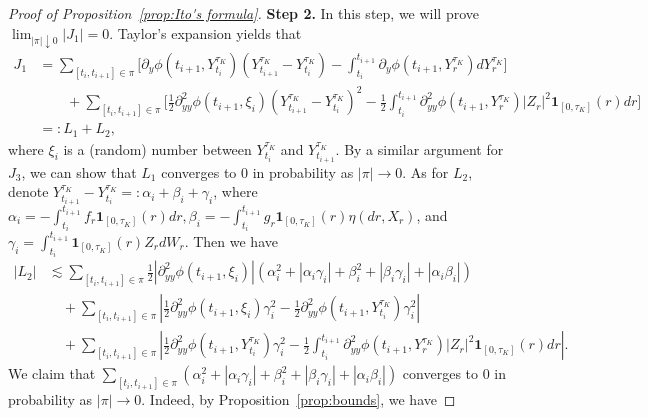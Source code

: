 \documentclass[11pt,reqno]{amsart}
\numberwithin{equation}{section}
\begin{document}
\begin{proof}[Proof of Proposition~\ref{prop:Ito's formula}]
\textbf{ Step 2.} In this step, we will prove $\lim_{|\pi|\downarrow 0} |J_1|=0$. Taylor's expansion yields that
\begin{equation*}					
\begin{aligned}
J_{1} &= \sum_{[t_{i},t_{i+1}]\in\pi}\Big[ \partial_{y}\phi(t_{i+1},Y^{\tau_{K}}_{t_{i}})\left(Y^{\tau_{K}}_{t_{i+1}}-Y^{\tau_{K}}_{t_{i}}\right) - \int_{t_{i}}^{t_{i+1}}\partial_{y}\phi(t_{i+1},Y^{\tau_{K}}_{r})dY^{\tau_{K}}_{r}\Big]\\
&\qquad + \sum_{[t_{i},t_{i+1}]\in\pi}\Big[ \frac{1}{2} \partial^{2}_{yy}\phi(t_{i+1},\xi_{i})\left(Y^{\tau_{K}}_{t_{i+1}}-Y^{\tau_{K}}_{t_i}\right)^{2}  - \frac{1}{2}\int_{t_{i}}^{t_{i+1}}\partial^{2}_{yy}\phi(t_{i+1},Y^{\tau_{K}}_{r})|Z_{r}|^{2}\mathbf{1}_{[0,\tau_{K}]}(r)dr\Big]\\[1mm]
&=: L_{1} + L_{2},
\end{aligned}
\end{equation*}
where $\xi_{i}$ is a (random) number between $Y_{t_{i}}^{\tau_K}$ and $Y_{t_{i+1}}^{\tau_K}$. 
By a similar argument for $J_3$, we can show that $L_1$ converges to 0 in probability as $|\pi|\to0$. As for $L_{2}$, denote $Y^{\tau_{K}}_{t_{i+1}}-Y^{\tau_{K}}_{t_{i}} =: \alpha_i+\beta_i+\gamma_i$,
where $\alpha_i =  - \int_{t_i}^{t_{i+1}} f_{r} \mathbf{1}_{[0,\tau_{K}]}(r) dr, \beta_i= - \int_{t_i}^{t_{i+1}}g_{r} \mathbf{1}_{[0,\tau_{K}]}(r)\eta(dr,X_{r})$, and $\gamma_i= \int_{t_i}^{t_{i+1}} \mathbf{1}_{[0,\tau_{K}]}(r)Z_{r}dW_{r}.$ Then we have	
\begin{equation}\label{e:estimate-Ito}	
\begin{aligned}
|L_{2}| &\lesssim \sum_{[t_{i},t_{i+1}]\in\pi} \frac{1}{2} |\partial^{2}_{yy}\phi(t_{i+1},\xi_{i})|\left( \alpha_i^{2} +\left|\alpha_i\gamma_i\right| +\beta_i^{2} + \left|\beta_i\gamma_i\right| + |\alpha_i \beta_i|\right)\\
&\quad +\sum_{[t_{i},t_{i+1}]\in\pi}\left| \frac{1}{2} \partial^{2}_{yy}\phi(t_{i+1},\xi_{i}) \gamma_i^{2} - \frac{1}{2} \partial^{2}_{yy}\phi(t_{i+1},Y^{\tau_{K}}_{t_{i}}) \gamma_i^{2}\right|\\						
&\quad + \sum_{[t_{i},t_{i+1}]\in\pi}\left|\frac{1}{2} \partial^{2}_{yy}\phi(t_{i+1},Y^{\tau_{K}}_{t_{i}})  \gamma_i^{2}  - \frac{1}{2}\int_{t_{i}}^{t_{i+1}}\partial^{2}_{yy}\phi(t_{i+1},Y^{\tau_{K}}_{r})|Z_{r}|^{2}\mathbf{1}_{[0,\tau_{K}]}(r)dr\right|.
\end{aligned}
\end{equation}
We claim that $\sum_{[t_{i},t_{i+1}]\in\pi} \left( \alpha_i^{2} +\left|\alpha_i\gamma_i\right| +\beta_i^{2} + \left|\beta_i\gamma_i\right| + |\alpha_i \beta_i|\right)$ converges to 0 in probability as $|\pi|\to0$. Indeed, by Proposition~\ref{prop:bounds}, we have

\end{proof}
\end{document}
